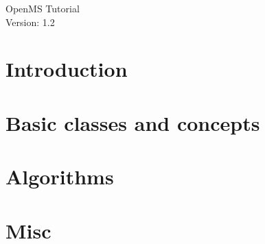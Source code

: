 \documentclass[a4paper]{article}
\begin{document}
\begin{titlepage}
\vspace*{7cm}
\begin{center}
{\Large OpenMS Tutorial\\[1ex]\large Version: 1.2 }\\
\end{center}
\end{titlepage}


\setcounter{tocdepth}{2}
\tableofcontents
\pagebreak

\section{Introduction}

	
	\pagebreak
	
	\pagebreak
	


\pagebreak
\section{Basic classes and concepts}

	
	\pagebreak
	
	\pagebreak
	
	\pagebreak
	
	\pagebreak
	
	\pagebreak
	


\pagebreak
\section{Algorithms}

	
	\pagebreak
	
	\pagebreak
	
	\pagebreak
	

\pagebreak
\section{Misc}

	
	\pagebreak
	
	\pagebreak
	
	\pagebreak
	
\end{document}
